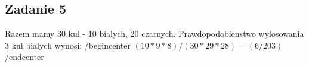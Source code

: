 \subsection{Zadanie 5}

Razem mamy 30 kul - 10 bialych, 20 czarnych.
Prawdopodobienstwo wylosowania 3 kul bialych wynosi:
/begin{center}
  $(10*9*8)/(30*29*28) = (6/203)$
/end{center}

